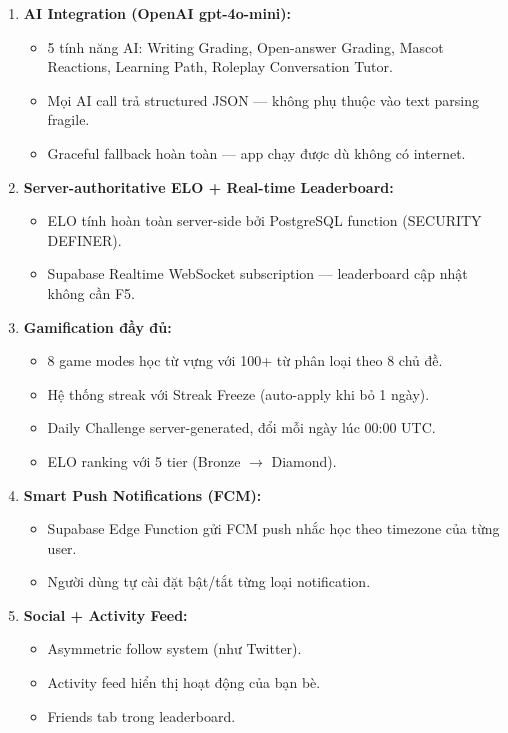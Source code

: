\documentclass[12pt,a4paper]{article}
\begin{document}
\begin{enumerate}
  \item \textbf{AI Integration (OpenAI gpt-4o-mini):}
    \begin{itemize}
      \item 5 tính năng AI: Writing Grading, Open-answer Grading, Mascot Reactions,
            Learning Path, Roleplay Conversation Tutor.
      \item Mọi AI call trả structured JSON — không phụ thuộc vào text parsing fragile.
      \item Graceful fallback hoàn toàn — app chạy được dù không có internet.
    \end{itemize}

  \item \textbf{Server-authoritative ELO + Real-time Leaderboard:}
    \begin{itemize}
      \item ELO tính hoàn toàn server-side bởi PostgreSQL function (SECURITY DEFINER).
      \item Supabase Realtime WebSocket subscription — leaderboard cập nhật không cần F5.
    \end{itemize}

  \item \textbf{Gamification đầy đủ:}
    \begin{itemize}
      \item 8 game modes học từ vựng với 100+ từ phân loại theo 8 chủ đề.
      \item Hệ thống streak với Streak Freeze (auto-apply khi bỏ 1 ngày).
      \item Daily Challenge server-generated, đổi mỗi ngày lúc 00:00 UTC.
      \item ELO ranking với 5 tier (Bronze $\to$ Diamond).
    \end{itemize}

  \item \textbf{Smart Push Notifications (FCM):}
    \begin{itemize}
      \item Supabase Edge Function gửi FCM push nhắc học theo timezone của từng user.
      \item Người dùng tự cài đặt bật/tắt từng loại notification.
    \end{itemize}

  \item \textbf{Social + Activity Feed:}
    \begin{itemize}
      \item Asymmetric follow system (như Twitter).
      \item Activity feed hiển thị hoạt động của bạn bè.
      \item Friends tab trong leaderboard.
    \end{itemize}
\end{enumerate}
\end{document}
